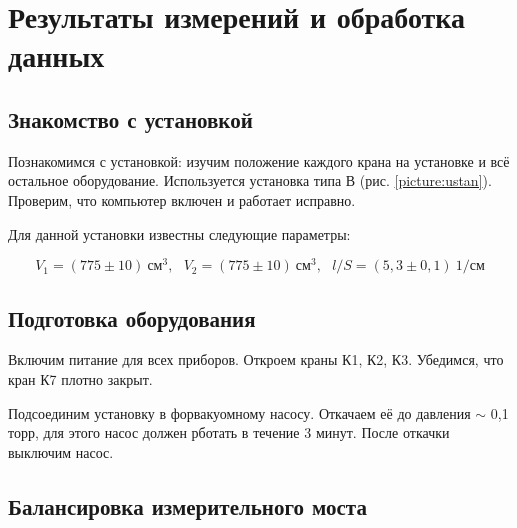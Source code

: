 \documentclass[a4paper,12pt]{article}
\begin{document}


\section{Результаты измерений и обработка данных}

\subsection{Знакомство с установкой}

Познакомимся с установкой: изучим положение каждого крана на установке и всё остальное оборудование. Используется установка типа В (рис. \ref{picture:ustan}). Проверим, что компьютер включен и работает исправно.

Для данной установки известны следующие параметры:

\begin{equation}
    V_1 = (775 \pm 10) \ \text{см}^3, \ \ \ V_2 = (775 \pm 10) \ \text{см}^3, \ \ \ l/S = (5,3 \pm 0,1) \ 1/\text{см}
\end{equation}

\subsection{Подготовка оборудования}
\label{p:2}

Включим питание для всех приборов. Откроем краны К1, К2, К3. Убедимся, что кран К7 плотно закрыт.

Подсоединим установку в форвакуомному насосу. Откачаем её до давления $\sim$ 0,1 торр, для этого насос должен рботать в течение 3 минут. После откачки выключим насос.

\subsection{Балансировка измерительного моста}
\end{document}

